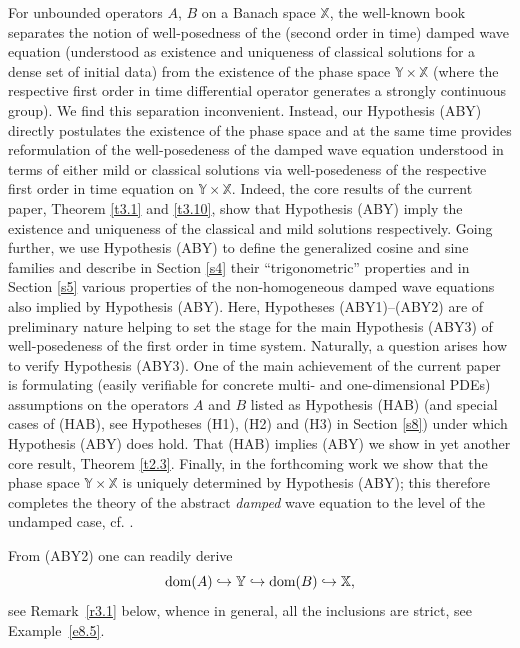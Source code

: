 \documentclass[11pt]{amsart}
\numberwithin{equation}{section}
\theoremstyle{remark}
\theoremstyle{definition}
\newcommand\bX{{\mathbb X}}
\newcommand\bY{{\mathbb Y}}
\newcommand{\dom}{\text{\rm{dom}}}
\begin{document}
For unbounded operators $A$, $B$ on a Banach space $\bX$, the well-known book \cite{Fa}
separates the notion of well-posedness of the (second order in time) damped wave equation (understood as existence and uniqueness of classical solutions for a dense set of initial data) from the existence of the phase space $\bY\times\bX$ (where the respective first order in time differential operator generates a strongly continuous group).  
We find this separation inconvenient. Instead, our Hypothesis \textnormal{(ABY)} directly postulates the existence of the phase space and at the same time provides reformulation of the well-posedeness of 
the damped wave equation understood in terms of either mild or classical solutions via well-posedeness of the respective first order in time equation on $\bY\times\bX$. Indeed, the core results of the current paper, Theorem \ref{t3.1} and \ref{t3.10}, show that Hypothesis \textnormal{(ABY)} imply the existence and uniqueness of the classical and mild solutions respectively. Going further, we use Hypothesis \textnormal{(ABY)} to define the generalized cosine and sine families and describe in Section \ref{s4} their ``trigonometric'' properties and in Section \ref{s5} various properties of the non-homogeneous damped wave equations also implied by Hypothesis \textnormal{(ABY)}. Here, Hypotheses \textnormal{(ABY1)--(ABY2)} are of preliminary nature helping to set the stage for the main Hypothesis \textnormal{(ABY3)} of well-posedeness of the first order in time system. Naturally, a question arises how to verify Hypothesis \textnormal{(ABY3)}. One of the main achievement of the current paper is formulating (easily verifiable for concrete multi- and one-dimensional
PDEs) assumptions on the operators $A$ and $B$ listed as Hypothesis \textnormal{(HAB)} (and special cases of \textnormal{(HAB)}, see Hypotheses \textnormal{(H1)}, \textnormal{(H2)} and \textnormal{(H3)} in Section \ref{s8}) under which Hypothesis \textnormal{(ABY)} does hold. That \textnormal{(HAB)} implies \textnormal{(ABY)} we show in yet another core result, 
Theorem \ref{t2.3}. Finally, in the forthcoming work \cite{SeconPaper} we show that the phase space $\bY\times\bX$ is uniquely determined by  Hypothesis \textnormal{(ABY)}; 
this therefore completes the theory of the abstract \emph{damped} wave equation to the level of the undamped case, cf. \cite[Theorem 3.14.11]{ABHN}.


From (ABY2) one can readily derive
\begin{equation}\label{space embedding}
	\dom(A)\hookrightarrow\bY\hookrightarrow\dom(B)\hookrightarrow\bX,	
\end{equation}	
see Remark~\ref{r3.1} below, whence in general, all the inclusions are strict, see Example~\ref{e8.5}.
\end{document}
